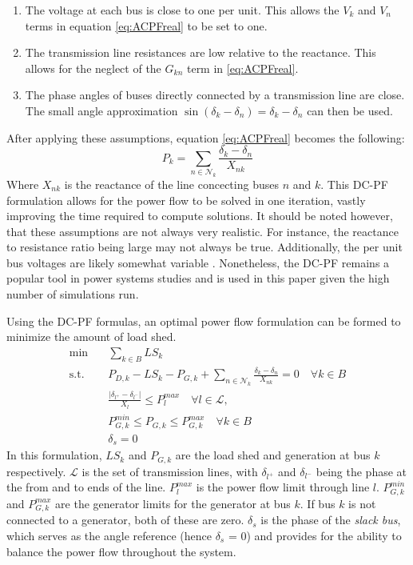 \documentclass[12pt]{article}
\begin{document}
\begin{enumerate}
  \item The voltage at each bus is close to one per unit. This allows the $V_k$ and $V_n$ terms in equation \eqref{eq:ACPFreal} to be set to one.
  \item The transmission line resistances are low relative to the reactance. This allows for the neglect of the $G_{kn}$ term in \eqref{eq:ACPFreal}.
  \item The phase angles of buses directly connected by a transmission line are close. The small angle approximation $\sin(\delta_k - \delta_n) = \delta_k - \delta_n$ can then be used. 
\end{enumerate}
After applying these assumptions, equation \eqref{eq:ACPFreal}  becomes the following:
\begin{equation} 
    P_k = \sum_{ n \in \mathcal{N}_k }\frac{\delta_k - \delta_n}{X_{nk}}
    \label{eq:DCPF}
\end{equation}
Where $X_{nk}$ is the reactance of the line concecting buses $n$ and $k$. This DC-PF formulation allows for the power flow to be solved in one iteration, vastly improving the time required to compute solutions. It should be noted however, that these assumptions are not always very realistic. For instance, the reactance to resistance ratio being large may not always be true. Additionally, the per unit bus voltages are likely somewhat variable \cite{purchala2005}. Nonetheless, the DC-PF remains a popular tool in power systems studies \cite{purchala2005} and is used in this paper given the high number of simulations run. \par
Using the DC-PF formulas, an optimal power flow formulation can be formed to minimize the amount of load shed. 
\begin{align}
    \min \quad & \sum_{k\in B}LS_k \\  
    \text{s.t.} \quad & P_{D, k} - LS_k - P_{G, k} +\sum_{ n \in \mathcal{N}_k }\frac{\delta_k - \delta_n}{X_{nk}} = 0 \quad\forall k\in B \label{powerbalance} \\  
                      & \frac{|\delta_{l^+} - \delta_{l^-}|}{X_{l}} \leq P_{l}^{max} \quad\forall l\in \mathcal{L}, \\  
                      & P_{G, k}^{min}\leq P_{G,k} \leq P_{G, k}^{max} \quad \forall k\in B \\
                      & \delta_s = 0
\end{align}	
In this formulation, $LS_k$ and $P_{G, k}$  are the load shed and generation at bus $k$ respectively. $\mathcal{L}$ is the set of transmission lines, with $\delta_{l^+}$ and $\delta_{l^-}$ being the phase at the from and to ends of the line. $P_{l}^{max}$ is the power flow limit through line $l$.   $P _{G, k}^{min}$ and $P _{G, k}^{max}$ are the generator limits for the generator at bus $k$. If bus $k$ is not connected to a generator, both of these are zero. $\delta_s$ is the phase of the \textit{slack bus}, which serves as the angle reference (hence $\delta_s$ = 0) and provides for the ability to balance the power flow throughout the system. \par
\end{document}
